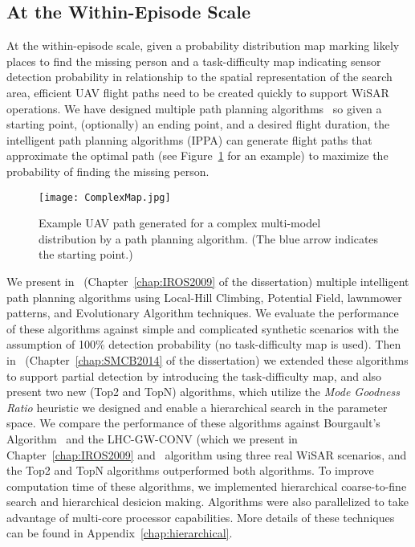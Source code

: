 \subsection{At the Within-Episode Scale}

At the within-episode scale, given a probability distribution map marking likely places to find the missing person and a task-difficulty map indicating sensor detection probability in relationship to the spatial representation of the search area, efficient UAV flight paths need to be created quickly to support WiSAR operations. We have designed multiple path planning algorithms~\cite{Lin2009UAV,Lin2014Hierarchical} so given a starting point, (optionally) an ending point, and a desired flight duration, the intelligent path planning algorithms (IPPA) can generate flight paths that approximate the optimal path (see Figure~\ref{path} for an example) to maximize the probability of finding the missing person.

\begin{figure}
\centering
\texttt{[image: ComplexMap.jpg]}
\caption[An example UAV path generated by a path planning algorithm]{Example UAV path generated for a complex multi-model distribution by a path planning algorithm. (The blue arrow indicates the starting point.)}
\label{path}
\end{figure}

We present in~\cite{Lin2009UAV} (Chapter~\ref{chap:IROS2009} of the dissertation) multiple intelligent path planning algorithms using Local-Hill Climbing, Potential Field, lawnmower patterns, and Evolutionary Algorithm techniques. We evaluate the performance of these algorithms against simple and complicated synthetic scenarios with the assumption of 100\% detection probability (no task-difficulty map is used). Then in~\cite{Lin2014Hierarchical} (Chapter~\ref{chap:SMCB2014} of the dissertation) we extended these algorithms to support partial detection by introducing the task-difficulty map, and also present two new (Top2 and TopN) algorithms, which utilize the \textit{Mode Goodness Ratio} heuristic we designed and enable a hierarchical search in the parameter space. We compare the performance of these algorithms against Bourgault's Algorithm~\cite{Bourgault2006Optimal} and the LHC-GW-CONV (which we present in Chapter~\ref{chap:IROS2009} and~\cite{Lin2009UAV} algorithm using three real WiSAR scenarios, and the Top2 and TopN algorithms outperformed both algorithms. To improve computation time of these algorithms, we implemented hierarchical coarse-to-fine search and hierarchical desicion making. Algorithms were also parallelized to take advantage of multi-core processor capabilities. More details of these techniques can be found in Appendix~\ref{chap:hierarchical}.

